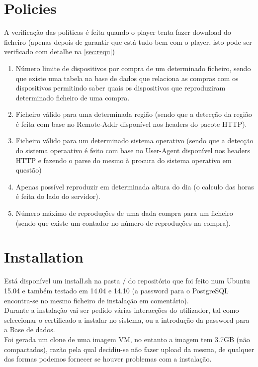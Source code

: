 \documentclass[11pt,a4paper]{report}
\begin{document}
\chapter{Policies}
A verificação das políticas é feita quando o player tenta fazer download do ficheiro (apenas depois de garantir que está tudo bem com o player, isto pode ser verificado com detalhe na \autoref{sec:requ})
\begin{enumerate}
\item Número limite de dispositivos por compra de um determinado ficheiro, sendo que existe uma tabela na base de dados que relaciona as compras com os dispositivos permitindo saber quais os dispositivos que reproduziram determinado ficheiro de uma compra.
\item Ficheiro válido para uma determinada região (sendo que a detecção da região é feita com base no Remote-Addr disponível nos headers do pacote HTTP).
\item Ficheiro válido para um determinado sistema operativo (sendo que a detecção do sistema operaativo é feito com base no User-Agent disponível nos headers HTTP e fazendo o parse do mesmo à procura do sistema operativo em questão)
\item Apenas possível reproduzir em determinada altura do dia (o calculo das horas é feita do lado do servidor).
\item Número máximo de reproduções de uma dada compra para um ficheiro (sendo que existe um contador no número de reproduções na compra).
\end{enumerate}

\chapter{Installation}

Está disponível um install.sh na pasta / do repositório que foi feito num Ubuntu 15.04 e também testado em 14.04 e 14.10 (a password para o PostgreSQL encontra-se no mesmo ficheiro de instalação em comentário).\\

Durante a instalação vai ser pedido várias interacções do utilizador, tal como seleccionar o certificado a instalar no sistema, ou a introdução da password para a Base de dados.\\

Foi gerada um clone de uma imagem VM, no entanto a imagem tem 3.7GB (não compactados), razão pela qual decidiu-se não fazer upload da mesma, de qualquer das formas podemos fornecer se houver problemas com a instalação.
\end{document}
